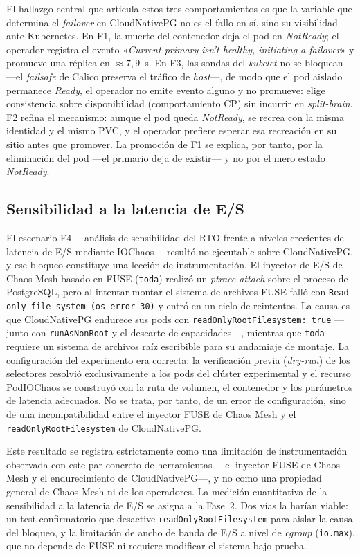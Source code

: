 \documentclass[12pt,twocolumn,letterpaper]{article}
\begin{document}
El hallazgo central que articula estos tres comportamientos es que la variable que determina el \textit{failover} en CloudNativePG no es el fallo en sí, sino su visibilidad ante Kubernetes. En F1, la muerte del contenedor deja el pod en \textit{NotReady}; el operador registra el evento «\textit{Current primary isn't healthy, initiating a failover}» y promueve una réplica en $\approx 7{,}9$~s. En F3, las sondas del \textit{kubelet} no se bloquean —el \textit{failsafe} de Calico preserva el tráfico de \textit{host}—, de modo que el pod aislado permanece \textit{Ready}, el operador no emite evento alguno y no promueve: elige consistencia sobre disponibilidad (comportamiento CP) sin incurrir en \textit{split-brain}. F2 refina el mecanismo: aunque el pod queda \textit{NotReady}, se recrea con la misma identidad y el mismo PVC, y el operador prefiere esperar esa recreación en su sitio antes que promover. La promoción de F1 se explica, por tanto, por la eliminación del pod —el primario deja de existir— y no por el mero estado \textit{NotReady}.

\subsection{Sensibilidad a la latencia de E/S}
El escenario F4 —análisis de sensibilidad del RTO frente a niveles crecientes de latencia de E/S mediante IOChaos— resultó no ejecutable sobre CloudNativePG, y ese bloqueo constituye una lección de instrumentación. El inyector de E/S de Chaos Mesh basado en FUSE (\texttt{toda}) realizó un \textit{ptrace attach} sobre el proceso de PostgreSQL, pero al intentar montar el sistema de archivos FUSE falló con \texttt{Read-only file system (os error 30)} y entró en un ciclo de reintentos. La causa es que CloudNativePG endurece sus pods con \texttt{readOnlyRootFilesystem: true} —junto con \texttt{runAsNonRoot} y el descarte de capacidades—, mientras que \texttt{toda} requiere un sistema de archivos raíz escribible para su andamiaje de montaje. La configuración del experimento era correcta: la verificación previa (\textit{dry-run}) de los selectores resolvió exclusivamente a los pods del clúster experimental y el recurso PodIOChaos se construyó con la ruta de volumen, el contenedor y los parámetros de latencia adecuados. No se trata, por tanto, de un error de configuración, sino de una incompatibilidad entre el inyector FUSE de Chaos Mesh y el \texttt{readOnlyRootFilesystem} de CloudNativePG.

Este resultado se registra estrictamente como una limitación de instrumentación observada con este par concreto de herramientas —el inyector FUSE de Chaos Mesh y el endurecimiento de CloudNativePG—, y no como una propiedad general de Chaos Mesh ni de los operadores. La medición cuantitativa de la sensibilidad a la latencia de E/S se asigna a la Fase~2. Dos vías la harían viable: un test confirmatorio que desactive \texttt{readOnlyRootFilesystem} para aislar la causa del bloqueo, y la limitación de ancho de banda de E/S a nivel de \textit{cgroup} (\texttt{io.max}), que no depende de FUSE ni requiere modificar el sistema bajo prueba.
\end{document}
